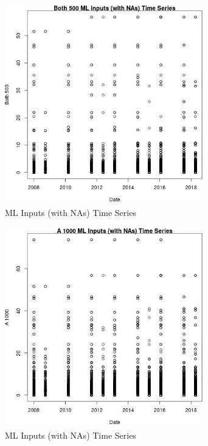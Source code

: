 \begin{figure} 
\centering  
\includegraphics[width=0.77\textwidth]{Code_Outputs/Report_ML_input_PM25_Step4_part_e_de_duplicated_aves_compiled_2019-05-18wNAs_Both_500vDate.jpg} 
\caption{\label{fig:Report_ML_input_PM25_Step4_part_e_de_duplicated_aves_compiled_2019-05-18wNAsBoth_500vDate}ML Inputs (with NAs) Time Series} 
\end{figure} 
 

\clearpage 

\begin{figure} 
\centering  
\includegraphics[width=0.77\textwidth]{Code_Outputs/Report_ML_input_PM25_Step4_part_e_de_duplicated_aves_compiled_2019-05-18wNAs_A_1000vDate.jpg} 
\caption{\label{fig:Report_ML_input_PM25_Step4_part_e_de_duplicated_aves_compiled_2019-05-18wNAsA_1000vDate}ML Inputs (with NAs) Time Series} 
\end{figure} 
 

